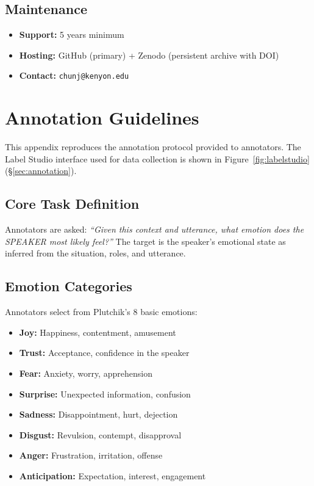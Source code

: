 \documentclass[twoside,11pt]{article}
\begin{document}
\subsection{Maintenance}
\begin{itemize}[leftmargin=*,noitemsep]
    \item \textbf{Support:} 5 years minimum
    \item \textbf{Hosting:} GitHub (primary) + Zenodo (persistent archive with DOI)
    \item \textbf{Contact:} \texttt{chunj@kenyon.edu}
\end{itemize}

\section{Annotation Guidelines}
\label{app:guidelines}

This appendix reproduces the annotation protocol provided to annotators. The Label Studio interface used for data collection is shown in Figure~\ref{fig:labelstudio} (\S\ref{sec:annotation}).

\subsection{Core Task Definition}

Annotators are asked: \textit{``Given this context and utterance, what emotion does the SPEAKER most likely feel?''} The target is the speaker's emotional state as inferred from the situation, roles, and utterance.

\subsection{Emotion Categories}

Annotators select from Plutchik's 8 basic emotions:

\begin{itemize}[leftmargin=*,noitemsep]
    \item \textbf{Joy:} Happiness, contentment, amusement
    \item \textbf{Trust:} Acceptance, confidence in the speaker
    \item \textbf{Fear:} Anxiety, worry, apprehension
    \item \textbf{Surprise:} Unexpected information, confusion
    \item \textbf{Sadness:} Disappointment, hurt, dejection
    \item \textbf{Disgust:} Revulsion, contempt, disapproval
    \item \textbf{Anger:} Frustration, irritation, offense
    \item \textbf{Anticipation:} Expectation, interest, engagement
\end{itemize}
\end{document}
